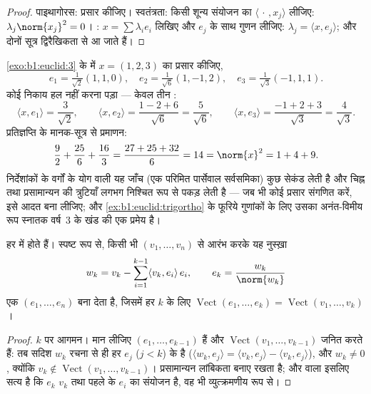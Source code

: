 \begin{proof}
पाइथागोरस: प्रसार कीजिए। स्वतंत्रता: किसी शून्य संयोजन का $\langle\,\cdot\,,
x_j\rangle$ लीजिए: $\lambda_j \norm{x_j}^2 = 0$। : $x = \sum
\lambda_i e_i$ लिखिए और $e_j$ के साथ गुणन लीजिए: $\lambda_j = \langle x,
e_j\rangle$; और दोनों सूत्र द्विरैखिकता से आ जाते हैं।
\end{proof}

\begin{example}[लांबिक-प्रसामान्य निर्देशांक, पार्सेवाल जाँच के साथ]
\label{ex:b1:euclid:parsevalcheck}
\cref{exo:b1:euclid:3} के   में $x = (1, 2, 3)$ का
प्रसार कीजिए,
\[
e_1 = \tfrac{1}{\sqrt2}(1,1,0), \quad
e_2 = \tfrac{1}{\sqrt6}(1,-1,2), \quad
e_3 = \tfrac{1}{\sqrt3}(-1,1,1).
\]
कोई निकाय हल नहीं करना पड़ा --- केवल तीन :
\[
\langle x, e_1\rangle = \frac{3}{\sqrt2},
\qquad
\langle x, e_2\rangle = \frac{1 - 2 + 6}{\sqrt6} =
\frac{5}{\sqrt6},
\qquad
\langle x, e_3\rangle = \frac{-1 + 2 + 3}{\sqrt3} =
\frac{4}{\sqrt3}.
\]
प्रतिज्ञप्ति के मानक-सूत्र से प्रमाणन:
\[
\frac{9}{2} + \frac{25}{6} + \frac{16}{3}
= \frac{27 + 25 + 32}{6} = 14 = \norm{x}^2 = 1 + 4 + 9 .
\]
निर्देशांकों के वर्गों के योग वाली यह जाँच (एक परिमित पार्सेवाल सर्वसमिका)
कुछ सेकंड लेती है और चिह्न तथा प्रसामान्यन की त्रुटियाँ लगभग निश्चित रूप से
पकड़ लेती है --- जब भी कोई  प्रसार संगणित करें, इसे आदत बना
लीजिए; और \cref{ex:b1:euclid:trigortho} के फूरिये गुणांकों के लिए उसका
अनंत-विमीय रूप स्नातक वर्ष~3 के खंड की एक प्रमेय है।
\end{example}

\begin{theorem}[ग्राम--श्मिट]\label{thm:b1:euclid:gramschmidt}
हर  में   होते हैं। स्पष्ट रूप से, किसी
भी  $(v_1, \dots, v_n)$ से आरंभ करके यह नुस्ख़ा
\[
w_k = v_k - \sum_{i=1}^{k-1} \langle v_k, e_i\rangle\, e_i ,
\qquad
e_k = \frac{w_k}{\norm{w_k}}
\]
एक   $(e_1, \dots, e_n)$ बना देता है, जिसमें हर $k$ के
लिए $\operatorname{Vect}(e_1, \dots, e_k) = \operatorname{Vect}(v_1, \dots,
v_k)$।
\end{theorem}

\begin{proof}
$k$ पर आगमन। मान लीजिए $(e_1, \dots, e_{k-1})$  हैं और
$\operatorname{Vect}(v_1, \dots, v_{k-1})$ जनित करते हैं: तब सदिश $w_k$ रचना
से ही हर $e_j$ ($j < k$) के  है ($\langle w_k, e_j \rangle = \langle
v_k, e_j\rangle - \langle v_k, e_j\rangle$), और $w_k \neq 0$, क्योंकि $v_k
\notin \operatorname{Vect}(v_1, \dots, v_{k-1})$। प्रसामान्यन लांबिकता बनाए
रखता है; और  वाला  इसलिए सत्य है कि $e_k$ $v_k$ तथा पहले के
$e_i$ का संयोजन है, वह भी व्युत्क्रमणीय रूप से।
\end{proof}

